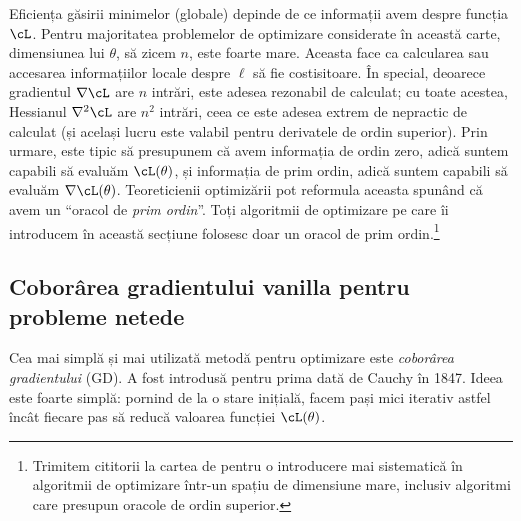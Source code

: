 \documentclass[../../book-main_ro.tex]{subfiles}
\begin{document}
Eficiența găsirii minimelor (globale) depinde de ce informații avem despre funcția \(\cL\). Pentru majoritatea problemelor de optimizare considerate în această carte, dimensiunea lui \(\theta\), să zicem \(n\), este foarte mare. Aceasta face ca calcularea sau accesarea informațiilor locale despre \(\ell\) să fie costisitoare. În special, deoarece gradientul \(\nabla \cL\) are \(n\) intrări, este adesea rezonabil de calculat; cu toate acestea, Hessianul \(\nabla^{2} \cL\) are \(n^{2}\) intrări, ceea ce este adesea extrem de nepractic de calculat (și același lucru este valabil pentru derivatele de ordin superior). Prin urmare, este tipic să presupunem că avem informația de ordin zero, adică suntem capabili să evaluăm \(\cL(\theta)\), și informația de prim ordin, adică suntem capabili să evaluăm \(\nabla \cL(\theta)\). Teoreticienii optimizării pot reformula aceasta spunând că avem un ``oracol de \textit{prim ordin}''. Toți algoritmii de optimizare pe care îi introducem în această secțiune folosesc doar un oracol de prim ordin.\footnote{Trimitem cititorii la cartea de \cite{Wright-Ma-2022} pentru o introducere mai sistematică în algoritmii de optimizare într-un spațiu de dimensiune mare, inclusiv algoritmi care presupun oracole de ordin superior.}

\subsection{Coborârea gradientului vanilla pentru probleme netede}

Cea mai simplă și mai utilizată metodă pentru optimizare este \textit{coborârea gradientului} (GD). A fost introdusă pentru prima dată de Cauchy în 1847. Ideea este foarte simplă: pornind de la o stare inițială, facem pași mici iterativ astfel încât fiecare pas să reducă valoarea funcției $\cL(\theta)$.
\end{document}
